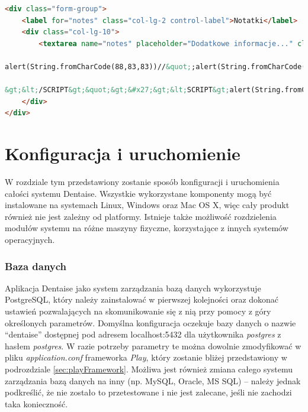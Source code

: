 \documentclass[11pt]{aghdpl}
\begin{document}
\begin{lstlisting}[language=HTML]
<div class="form-group">
    <label for="notes" class="col-lg-2 control-label">Notatki</label>
    <div class="col-lg-10">
        <textarea name="notes" placeholder="Dodatkowe informacje..." class="form-control" rows="5">&#x27;;alert(String.fromCharCode(88,83,83))//&#x27;;alert(String.fromCharCode(88,83,83))//&quot;;

alert(String.fromCharCode(88,83,83))//&quot;;alert(String.fromCharCode(88,83,83))//--

&gt;&lt;/SCRIPT&gt;&quot;&gt;&#x27;&gt;&lt;SCRIPT&gt;alert(String.fromCharCode(88,83,83))&lt;/SCRIPT&gt;</textarea>
    </div>
</div>
\end{lstlisting}


\chapter{Konfiguracja i uruchomienie}
\label{cha:konfiguracja_i_uruchomienie}

W rozdziale tym przedstawiony zostanie sposób konfiguracji i uruchomienia całości systemu Dentaise. Wszystkie wykorzystane komponenty mogą być instalowane na systemach Linux, Windows oraz Mac OS X, więc cały produkt również nie jest zależny od platformy. Istnieje także możliwość rozdzielenia modułów systemu na różne maszyny fizyczne, korzystające z innych systemów operacyjnych.

\subsection{Baza danych}

Aplikacja Dentaise jako system zarządzania bazą danych wykorzystuje PostgreSQL, który należy zainstalować w pierwszej kolejności oraz dokonać ustawień pozwalających na skomunikowanie się z nią przy pomocy z góry określonych parametrów. Domyślna konfiguracja oczekuje bazy danych o nazwie ``dentaise'' dostępnej pod adresem localhost:5432 dla użytkownika \emph{postgres} z hasłem \emph{postgres}. W razie potrzeby parametry te można dowolnie zmodyfikować w pliku \emph{application.conf} frameworka \emph{Play}, który zostanie bliżej przedstawiony w podrozdziale \ref{sec:playFramework}. Możliwa jest również zmiana całego systemu zarządzania bazą danych na inny (np. MySQL, Oracle, MS SQL) -- należy jednak podkreślić, że nie zostało to przetestowane i nie jest zalecane, jeśli nie zachodzi taka konieczność.
\end{document}
